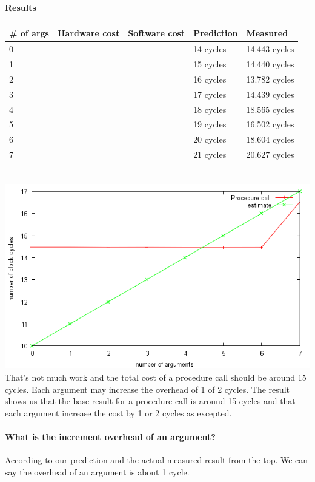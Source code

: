 \paragraph{Results}
\begin{tabular}{| l | l | l | l | l |}
\hline
\# of args & Hardware cost & Software cost & Prediction & Measured \\ \hline
0 &   &   & 14 cycles & 14.443 cycles \\ \hline
1 &   &   & 15 cycles & 14.440 cycles \\ \hline
2 &   &   & 16 cycles & 13.782 cycles \\ \hline
3 &   &   & 17 cycles & 14.439 cycles \\ \hline
4 &   &   & 18 cycles & 18.565 cycles \\ \hline
5 &   &   & 19 cycles & 16.502 cycles \\ \hline
6 &   &   & 20 cycles & 18.604 cycles \\ \hline
7 &   &   & 21 cycles & 20.627 cycles \\ \hline
\end{tabular} \\
\includegraphics{procCallImage}
That's not much work and the total cost of a procedure call should be around 15
cycles. Each argument may increase the overhead of 1 of 2 cycles.
The result shows us that the base result for a procedure call is around 15
cycles and that each argument increase the cost by 1 or 2 cycles as excepted.

\paragraph{What is the increment overhead of an argument?}
According to our prediction and the actual measured result from the top. We can say the overhead of an argument is about 1 cycle.


